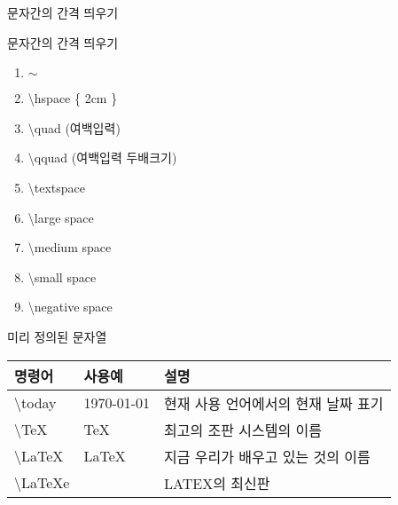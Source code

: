 \documentclass[ aspectratio=149,  10pt,blue,xcolor=pdftex,dvipsnames,table,handout,notes]{beamer}
\begin{document}
		\begin{frame}[t,allowframebreaks]{문자간의 간격 띄우기}

			\begin{block} {문자간의 간격 띄우기}
			\begin{enumerate}

			\item $\sim$\\
			\item \textbackslash hspace \{ 2cm \} \\
			\item \textbackslash quad 	(여백입력)\\
			\item \textbackslash qquad 	(여백입력 두배크기)\\
			\item \textbackslash textspace \\
			\item \textbackslash large space \\
			\item \textbackslash medium space \\
			\item \textbackslash small space \\
			\item \textbackslash negative space \\
			\end{enumerate}

			\end{block}

		\note[item]{}
		\end{frame}


		\begin{frame}[t,allowframebreaks]{미리 정의된 문자열}

			\begin{center}
			\begin{table}
			\begin{tabular}{ l l l  }
				명령어	&사용예	&설명\\
				\hline
				\textbackslash today 	&\today 		&현재 사용 언어에서의 현재 날짜 표기\\
				\textbackslash TeX 	&\TeX 		&최고의 조판 시스템의 이름\\
				\textbackslash LaTeX 	&\LaTeX 		&지금 우리가 배우고 있는 것의 이름\\
				\textbackslash LaTeXe 	&\LaTeXe		&LATEX의 최신판\\
			\end{tabular}
			\end{table}
			\end{center}

		\note[item]{}
		\end{frame}
\end{document}
